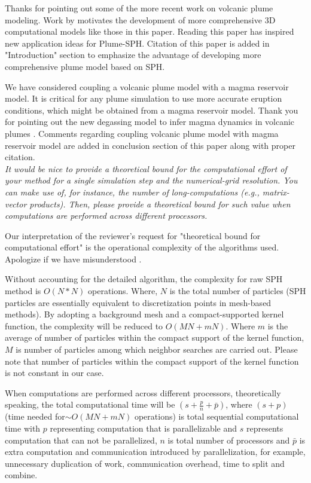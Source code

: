 \documentclass{article}
\begin{document}
Thanks for pointing out some of the more recent work on volcanic plume modeling. 
Work by \citet{costa2018understanding} motivates the development of more comprehensive 3D computational models like those in this paper. Reading this paper has inspired new application ideas for Plume-SPH. Citation of this paper is added in "Introduction" section to emphasize the advantage of developing more comprehensive plume model based on SPH.

We have considered coupling a volcanic plume model with a magma reservoir model. It is critical for any plume simulation to use more accurate eruption conditions, which might be obtained from a magma reservoir model. Thank you for pointing out the new degassing model to infer magma dynamics in volcanic plumes \cite{terray2018new}. Comments regarding coupling volcanic plume model with magma reservoir model are added in conclusion section of this paper along with proper citation.
\\[3pt]

\textit{It would be nice to provide a theoretical bound for the computational effort of your method for a single simulation step and the numerical-grid resolution. You can make use of, for instance, the number of long-computations (e.g., matrix- vector products). Then, please provide a theoretical bound for such value when computations are performed across different processors.
}

Our interpretation of  the reviewer's request for "theoretical bound for computational effort" is the operational complexity of the algorithms used. Apologize if we  have misunderstood . 

Without accounting for the detailed algorithm, the complexity for raw SPH method is $O(N*N)$ operations. Where, $N$ is the total number of particles (SPH particles are essentially equivalent to discretization points  in mesh-based methods). By adopting a background mesh and a compact-supported kernel function, the  complexity will be reduced to $O(MN+mN)$. Where $m$ is the average of number of particles within the compact support of the kernel function, $M$ is number of particles among which neighbor searches are carried out. Please note that number of particles within the compact support of the kernel function is not constant in our case. 

When computations are performed across different processors, theoretically speaking, the total computational time will be $(s+\frac{p}{n}+\bar{p})$,  where $(s+p)$(time needed for$ \sim O(MN+mN)$ operations) is total sequential computational time with $p$ representing computation that is parallelizable and $s$ represents computation that can not be parallelized,  $n$ is total number of processors and $\bar{p}$ is extra computation and communication introduced by parallelization, for example, 
unnecessary duplication of work, communication overhead, time to split and combine.
\end{document}
